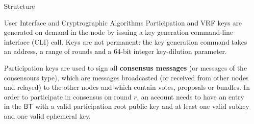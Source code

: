 \documentclass[10pt,a4paper]{article}
\begin{document}
\begin{section}{Strutcture}
\begin{subsection}{User Interface and Cryptrographic Algorithms}
    Participation and VRF keys are generated on demand in the node by issuing a key generation command-line
    interface (CLI) call.
    Keys are not permanent: the key generation command takes an address, a range of rounds and a 64-bit 
    integer key-dilution parameter.

    Participation keys are used to sign all {\bf consensus messages} (or messages of the consensours type),
    which are messages broadcasted (or received from other nodes and relayed) to the other nodes and which 
    contain votes, proposals or bundles.
    In order to participate in consensus on round $r$, an account needs to have an entry in the $\mathsf{BT}$ 
    with a valid participation root public key and at least one valid subkey and one valid ephemeral key.


\end{subsection}
\end{section}
\end{document}
